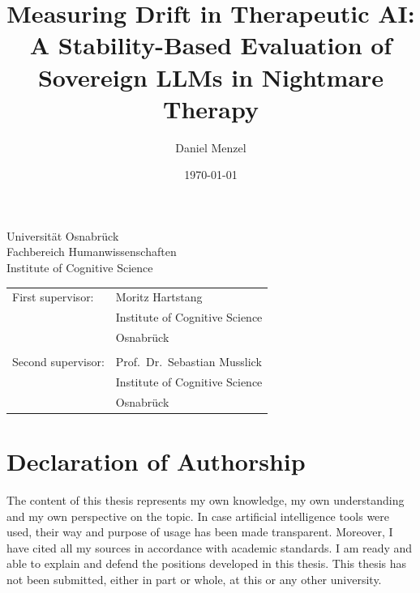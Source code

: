 \documentclass[11pt,
  paper=a4,
  bibliography=totocnumbered,
  captions=tableheading,
  BCOR=10mm
]{scrreprt}
\title{Measuring Drift in Therapeutic AI: A Stability-Based Evaluation of Sovereign LLMs in Nightmare Therapy}
\author{Daniel Menzel}
\date{\today}
\begin{document}
\begin{titlepage}
  \begin{flushleft}
    Universit\"at Osnabr\"uck\\
    Fachbereich Humanwissenschaften\\
    Institute of Cognitive Science
  \end{flushleft}

  \vspace{2cm}
  \vspace{1cm}

  \begin{tabular}{ll}
    First supervisor:  & Moritz Hartstang                \\
                       & Institute of Cognitive Science  \\
                       & Osnabr\"uck                     \\\\
    Second supervisor: & Prof.\ Dr.\ Sebastian Musslick  \\
                       & Institute of Cognitive Science  \\
                       & Osnabr\"uck
  \end{tabular}

\end{titlepage}


\chapter*{Declaration of Authorship}
The content of this thesis represents my own knowledge, my own understanding and my own perspective on the topic.
In case artificial intelligence tools were used, their way and purpose of usage has been made transparent.
Moreover, I have cited all my sources in accordance with academic standards.
I am ready and able to explain and defend the positions developed in this thesis.
This thesis has not been submitted, either in part or whole, at this or any other university.
\end{document}
